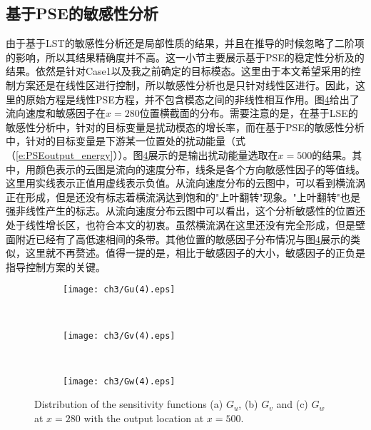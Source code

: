 \subsection{基于PSE的敏感性分析}
由于基于LST的敏感性分析还是局部性质的结果，并且在推导的时候忽略了二阶项的影响，所以其结果精确度并不高。这一小节主要展示基于PSE的稳定性分析及的结果。依然是针对Case1以及我之前确定的目标模态。这里由于本文希望采用的控制方案还是在线性区进行控制，所以敏感性分析也是只针对线性区进行。因此，这里的原始方程是线性PSE方程，并不包含模态之间的非线性相互作用。图\ref{f:Guvw1}给出了流向速度和敏感因子在$x =280$位置横截面的分布。需要注意的是，在基于LSE的敏感性分析中，针对的目标变量是扰动模态的增长率，而在基于PSE的敏感性分析中，针对的目标变量是下游某一位置处的扰动能量（式（\ref{e:PSEoutput_energy}））。图\ref{f:Guvw1}展示的是输出扰动能量选取在$x =500$的结果。其中，用颜色表示的云图是流向的速度分布，线条是各个方向敏感性因子的等值线。这里用实线表示正值用虚线表示负值。从流向速度分布的云图中，可以看到横流涡正在形成，但是还没有标志着横流涡达到饱和的"上叶翻转"现象。"上叶翻转"也是强非线性产生的标志。从流向速度分布云图中可以看出，这个分析敏感性的位置还处于线性增长区，也符合本文的初衷。虽然横流涡在这里还没有完全形成，但是壁面附近已经有了高低速相间的条带。其他位置的敏感因子分布情况与图\ref{f:Guvw1}展示的类似，这里就不再赘述。值得一提的是，相比于敏感因子的大小，敏感因子的正负是指导控制方案的关键。
\begin{figure}[H]
  \centering
  \begin{subfigure}{0.8\textwidth}
  \texttt{[image: ch3/Gu(4).eps]}
  \caption{\label{f:Gu1}}
  \end{subfigure}\\
  \bigskip
  \begin{subfigure}{0.8\textwidth}
  \texttt{[image: ch3/Gv(4).eps]}
  \caption{\label{f:Gv1}}
  \end{subfigure}\\
  \bigskip
  \begin{subfigure}{0.8\textwidth}
  \texttt{[image: ch3/Gw(4).eps]}
  \caption{\label{f:Gw1}}
  \end{subfigure}
  \caption{Distribution of the sensitivity functions (a) $G_u$, (b) $G_v$ and (c) $G_w$ at $x =280$ with the output location at $x =500$.}\label{f:Guvw1}
\end{figure}
